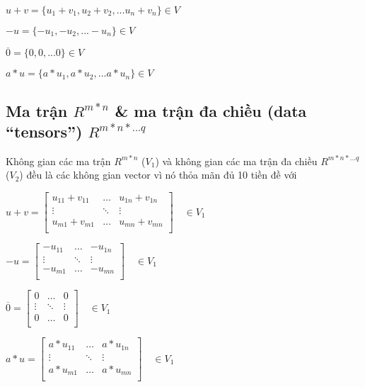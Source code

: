 \documentclass[a4paper,11pt]{article}
\theoremstyle{mytheor}
\begin{document}
    $u+v=\{u_1+v_1,u_2+v_2,...u_n+v_n\} \in V$
    
    $-u = \{-u_1,-u_2,...-u_n\} \in V$
    
    $\overline{0} = \{0,0,...0\} \in V$
    
    $a*u = \{a*u_1,a*u_2,... a*u_n\} \in V $

\subsection*{Ma trận $R^{m*n}$ \& ma trận đa chiều (data “tensors”) $R^{m*n*...q}$}
Không gian các ma trận $R^{m*n}$ ($V_1$) và không gian các ma trận đa chiều $R^{m*n*...q}$ ($V_2$) đều là các không gian vector vì nó thỏa mãn đủ 10 tiền đề với
    
    $u+v= \begin{bmatrix} 
            u_{1 1}+v_{1 1} & \dots & u_{1 n}+v_{1 n} \\
            \vdots & \ddots & \vdots \\
            u_{m 1}+v_{m 1} & \dots & u_{m n}+v_{m n} \\
            \end{bmatrix}
        \quad
    \in V_1$
    
    $-u = \begin{bmatrix} 
            -u_{1 1} & \dots & -u_{1 n} \\
            \vdots & \ddots & \vdots \\
            -u_{m 1} & \dots & -u_{m n} \\
            \end{bmatrix}
        \quad
    \in V_1$
    
    $\overline{0} = \begin{bmatrix} 
            0 & \dots & 0 \\
            \vdots & \ddots & \vdots \\
            0 & \dots & 0 \\
            \end{bmatrix}
        \quad \in V_1$
    
    $a*u = \begin{bmatrix} 
            a*u_{1 1} & \dots & a*u_{1 n} \\
            \vdots & \ddots & \vdots \\
            a*u_{m 1} & \dots & a*u_{m n} \\
            \end{bmatrix}
        \quad \in V_1 $
        
\end{document}
